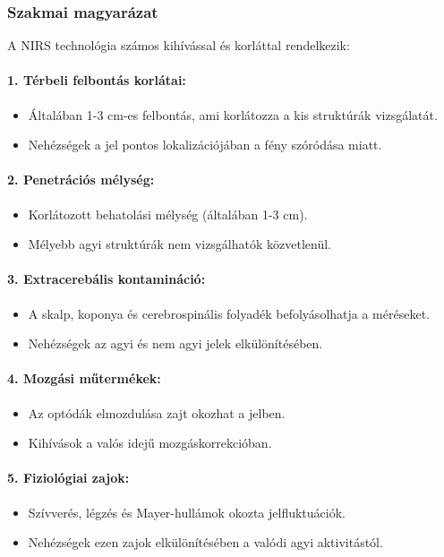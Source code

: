 \documentclass[a4paper,12pt]{article}
\begin{document}
\subsubsection{Szakmai magyarázat} A NIRS technológia számos kihívással és korláttal rendelkezik:

\paragraph{1. Térbeli felbontás korlátai:} \begin{itemize} \item Általában 1-3 cm-es felbontás, ami korlátozza a kis struktúrák vizsgálatát. \item Nehézségek a jel pontos lokalizációjában a fény szóródása miatt. \end{itemize}

\paragraph{2. Penetrációs mélység:} \begin{itemize} \item Korlátozott behatolási mélység (általában 1-3 cm). \item Mélyebb agyi struktúrák nem vizsgálhatók közvetlenül. \end{itemize}

\paragraph{3. Extracerebális kontamináció:} \begin{itemize} \item A skalp, koponya és cerebrospinális folyadék befolyásolhatja a méréseket. \item Nehézségek az agyi és nem agyi jelek elkülönítésében. \end{itemize}

\paragraph{4. Mozgási műtermékek:} \begin{itemize} \item Az optódák elmozdulása zajt okozhat a jelben. \item Kihívások a valós idejű mozgáskorrekcióban. \end{itemize}

\paragraph{5. Fiziológiai zajok:} \begin{itemize} \item Szívverés, légzés és Mayer-hullámok okozta jelfluktuációk. \item Nehézségek ezen zajok elkülönítésében a valódi agyi aktivitástól. \end{itemize}
\end{document}
